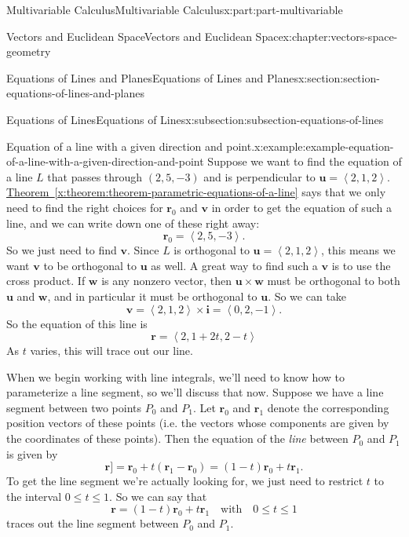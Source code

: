 \documentclass[twoside,10pt,]{book}
\newcommand{\xreffont}{\relax}
\numberwithin{equation}{part}
\newcommand{\dotprod}[1]{\left\langle #1 \right\rangle}
\begin{document}
\begin{partptx}{Multivariable Calculus}{}{Multivariable Calculus}{}{}{x:part:part-multivariable}
\begin{chapterptx}{Vectors and Euclidean Space}{}{Vectors and Euclidean Space}{}{}{x:chapter:vectors-space-geometry}
\begin{sectionptx}{Equations of Lines and Planes}{}{Equations of Lines and Planes}{}{}{x:section:section-equations-of-lines-and-planes}
\begin{subsectionptx}{Equations of Lines}{}{Equations of Lines}{}{}{x:subsection:subsection-equations-of-lines}
\begin{example}{Equation of a line with a given direction and point.}{x:example:example-equation-of-a-line-with-a-given-direction-and-point}
Suppose we want to find the equation of a line \(L\) that passes through \((2,5,-3)\) and is perpendicular to \(\mathbf{u} = \dotprod{2,1,2}\). \hyperref[x:theorem:theorem-parametric-equations-of-a-line]{Theorem~{\xreffont\ref{x:theorem:theorem-parametric-equations-of-a-line}}} says that we only need to find the right choices for \(\mathbf{r}_{0}\) and \(\mathbf{v}\) in order to get the equation of such a line, and we can write down one of these right away:%
%
\begin{equation*}
\mathbf{r}_{0} = \dotprod{2,5,-3}.
\end{equation*}
So we just need to find \(\mathbf{v}\). Since \(L\) is orthogonal to \(\mathbf{u} = \dotprod{2,1,2}\), this means we want \(\mathbf{v}\) to be orthogonal to \(\mathbf{u}\) as well. A great way to find such a \(\mathbf{v}\) is to use the cross product. If \(\mathbf{w}\) is any nonzero vector, then \(\mathbf{u}\times\mathbf{w}\) must be orthogonal to both \(\mathbf{u}\) and \(\mathbf{w}\), and in particular it must be orthogonal to \(\mathbf{u}\). So we can take%
%
\begin{equation*}
\mathbf{v} = \dotprod{2,1,2}\times\mathbf{i} = \dotprod{0,2,-1}.
\end{equation*}
So the equation of this line is%
%
\begin{equation*}
\mathbf{r} = \dotprod{2,1+2t,2-t}
\end{equation*}
As \(t\) varies, this will trace out our line.%
\end{example}
When we begin working with line integrals, we'll need to know how to parameterize a line segment, so we'll discuss that now. Suppose we have a line segment between two points \(P_{0}\) and \(P_{1}\). Let \(\mathbf{r}_{0}\) and \(\mathbf{r}_{1}\) denote the corresponding position vectors of these points (i.e. the vectors whose components are given by the coordinates of these points). Then the equation of the \emph{line} between \(P_{0}\) and \(P_{1}\) is given by%
%
\begin{equation*}
\mathbf{r}] = \mathbf{r}_{0}+t(\mathbf{r}_{1}-\mathbf{r}_{0}) = (1-t)\mathbf{r}_{0}+t\mathbf{r}_{1}.
\end{equation*}
To get the line segment we're actually looking for, we just need to restrict \(t\) to the interval \(0\leq t\leq 1\). So we can say that%
%
\begin{equation*}
\mathbf{r} = (1-t)\mathbf{r}_{0}+t\mathbf{r}_{1} \quad\text{with}\quad0\leq t\leq 1
\end{equation*}
traces out the line segment between \(P_{0}\) and \(P_{1}\).%

\end{subsectionptx}
\end{sectionptx}
\end{chapterptx}
\end{partptx}
\end{document}

